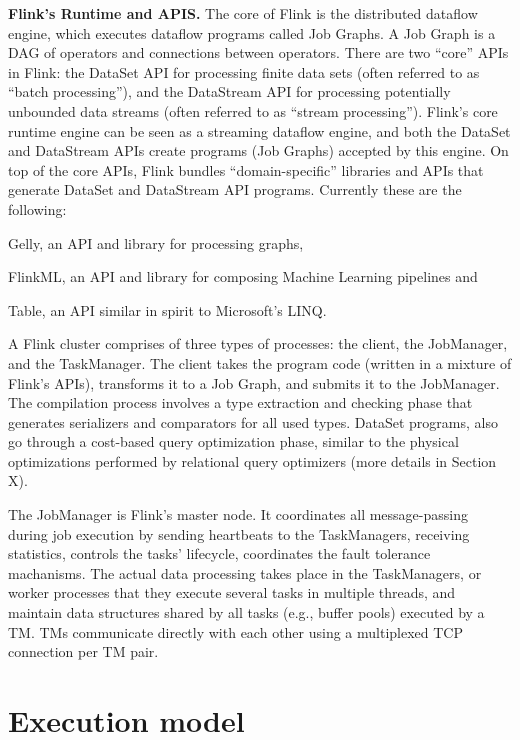 \documentclass[11pt]{article}
\begin{document}
\textbf{Flink's Runtime and APIS.} The core of Flink is the distributed dataflow engine, which executes dataflow programs called Job Graphs. A Job Graph is a DAG of operators and connections between operators. There are two ``core'' APIs in Flink: the DataSet API for processing finite data sets (often referred to as ``batch processing''), and the DataStream API for processing potentially unbounded data streams (often referred to as ``stream processing''). Flink's core runtime engine can be seen as a streaming dataflow engine, and both the DataSet and DataStream APIs create programs (Job Graphs) accepted by this engine. On top of the core APIs, Flink bundles ``domain-specific'' libraries and APIs that generate DataSet and DataStream API programs. Currently these are the following:
\begin{inparaenum}[i)]
  \item Gelly, an API and library for processing graphs,
  \item FlinkML, an API and library for composing Machine Learning pipelines and
  \item Table, an API similar in spirit to Microsoft's LINQ.
\end{inparaenum}
A Flink cluster comprises of three types of processes: the client, the JobManager, and the TaskManager. The client takes the program code (written in a mixture of Flink's APIs), transforms it to a Job Graph, and submits it to the JobManager. The compilation process involves a type extraction and checking phase that generates serializers and comparators for all used types. DataSet programs, also go through a cost-based query optimization phase, similar to the physical optimizations performed by relational query optimizers (more details in Section X).

The JobManager is Flink's master node. It coordinates all message-passing during job execution by sending heartbeats to the TaskManagers, receiving statistics, controls the tasks' lifecycle,  coordinates the fault tolerance machanisms. The actual data processing takes place in the TaskManagers, or worker processes that they execute several tasks in multiple threads, and maintain data structures shared by all tasks (e.g., buffer pools) executed by a TM. TMs communicate directly with each other using a multiplexed TCP connection per TM pair. 


\section{Execution model}
\end{document}
